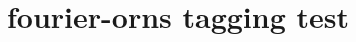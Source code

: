 \documentclass{article}
\title{fourier-orns tagging test}
\begin{document}
\grimace

\textxswdown

\oldpilcrowtwo
\end{document}
